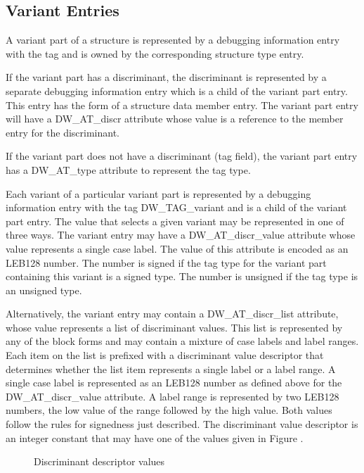 \subsection{Variant Entries}
\label{chap:variantentries}

A variant part of a structure is represented by a debugging
information entry with the 
tag  and is
owned by the corresponding structure type entry.

If the variant part has a discriminant, the discriminant is
represented by a separate debugging information entry which
is a child of the variant part entry. This entry has the form
of a structure data member entry. The variant part entry will
have a DW\_AT\_discr attribute whose value is a reference to
the member entry for the discriminant.

If the variant part does not have a discriminant (tag field),
the variant part entry has a DW\_AT\_type attribute to represent
the tag type.

Each variant of a particular variant part is represented by
a debugging information entry with the tag DW\_TAG\_variant
and is a child of the variant part entry. The value that
selects a given variant may be represented in one of three
ways. The variant entry may have a DW\_AT\_discr\_value attribute
whose value represents a single case label. The value of this
attribute is encoded as an LEB128 number. The number is signed
if the tag type for the variant part containing this variant
is a signed type. The number is unsigned if the tag type is
an unsigned type.

Alternatively, the variant entry may contain a DW\_AT\_discr\_list
attribute, whose value represents a list of discriminant
values. This list is represented by any of the block forms and
may contain a mixture of case labels and label ranges. Each
item on the list is prefixed with a discriminant value
descriptor that determines whether the list item represents
a single label or a label range. A single case label is
represented as an LEB128 number as defined above for the
DW\_AT\_discr\_value attribute. A label range is represented by
two LEB128 numbers, the low value of the range followed by the
high value. Both values follow the rules for signedness just
described. The discriminant value descriptor is an integer
constant that may have one of the values given in 
Figure .

\begin{figure}[here]
\caption{Discriminant descriptor values}\label{fig:discriminantdescriptorvalues}
\end{figure}

